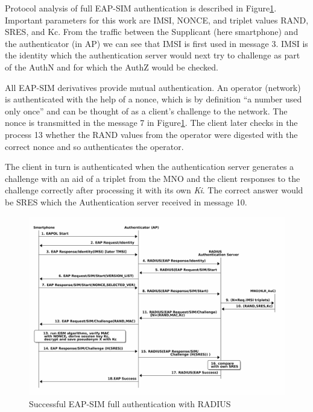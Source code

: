 \documentclass[12pt,a4paper,english]{tutthesis}
\begin{document}
\begin{otherlanguage}{english}
Protocol analysis of full EAP-SIM authentication is described 
in Figure\ref{fig:eap-sim-radius}.
Important parameters for this work are IMSI, NONCE, and triplet values
RAND, SRES, and Kc. 
From the traffic between the Supplicant (here smartphone) and the authenticator (in AP)
we can see that IMSI is first  used  in message 3. IMSI is the
identity which the authentication server would next try to challenge as
part of the AuthN and for which the AuthZ would be checked.







All EAP-SIM derivatives provide mutual authentication.
An operator (network) is authenticated with the help of a nonce,
which is by definition ``a number used only once'' and can
be thought of as a client's challenge to the network.
The nonce is transmitted in the message 7 in Figure\ref{fig:eap-sim-radius}.
The client later checks in the process 13 whether the RAND values 
from
the operator were digested with the correct nonce and so authenticates
the operator.

The client in turn is authenticated when the authentication server
generates a challenge with an aid of a triplet from the MNO and the
client responses to the challenge correctly after processing it with
its own \emph{Ki}.  The correct answer would be SRES which the Authentication
server received in message 10.
\begin{figure}[htb]
\centering
\includegraphics[width=.9\linewidth]{eap-sim-radius.png}
\caption{\label{fig:eap-sim-radius}Successful EAP-SIM full authentication with RADIUS}
\end{figure}




\end{otherlanguage}
\end{document}
